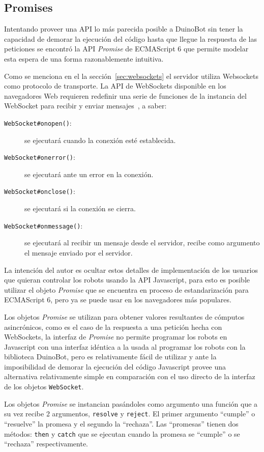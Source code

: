 \subsection{Promises}

Intentando proveer una API lo más parecida posible a DuinoBot sin
tener la capacidad de demorar la ejecución del código hasta que
llegue la respuesta de las peticiones se encontró la API
\textit{Promise} de ECMAScript 6 que permite modelar esta
espera de una forma razonablemente intuitiva.

Como se menciona en el la sección~\ref{sec:websockets} el servidor
utiliza Websockets como protocolo de transporte.
La API de WebSockets disponible en los navegadores Web requieren
redefinir una serie de funciones de la instancia del WebSocket
para recibir y enviar mensajes~\citep{websocket_2014}, a saber:
\begin{description}
    \item[\texttt{WebSocket\#onopen()}:] se ejecutará cuando
    la conexión esté establecida.
    \item[\texttt{WebSocket\#onerror()}:] se ejecutará ante un error en
    la conexión.
    \item[\texttt{WebSocket\#onclose()}:] se ejecutará si la conexión
    se cierra.
    \item[\texttt{WebSocket\#onmessage()}:] se ejecutará al recibir un
    mensaje desde el servidor, recibe como argumento el mensaje
    enviado por el servidor.
\end{description}

La intención del autor es ocultar estos detalles de implementación de
los usuarios que quieran controlar los robots usando la API Javascript,
para esto es posible utilizar el objeto \textit{Promise} que se encuentra
en proceso de estandarización para ECMAScript 6, pero ya se puede
usar en los navegadores más populares.

Los objetos \textit{Promise} se utilizan para obtener valores resultantes
de cómputos asincrónicos, como es el caso de la respuesta a una petición
hecha con WebSockets, la interfaz de \textit{Promise} no permite programar
los robots en Javascript con una interfaz idéntica a la usada al programar
los robots con la biblioteca DuinoBot, pero es relativamente fácil de
utilizar y ante la imposibilidad de demorar la ejecución del código
Javascript provee una alternativa
relativamente simple en comparación con el uso directo de la interfaz
de los objetos \texttt{WebSocket}.

Los objetos \textit{Promise} se instancian pasándoles como argumento una
función que a su vez recibe 2 argumentos, \texttt{resolve} y \texttt{reject}.
El primer argumento ``cumple'' o ``resuelve'' la promesa y el segundo la
``rechaza''.
Las ``promesas'' tienen dos métodos: \texttt{then} y \texttt{catch} que se
ejecutan cuando la promesa se ``cumple'' o se ``rechaza'' respectivamente.

